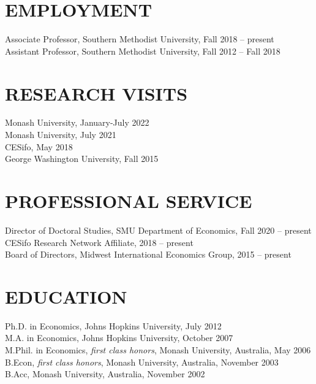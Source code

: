 \documentclass[11pt]{res}
\begin{document}
\begin{resume}
\hspace{-0.5in}\makebox[6.1in]{\hrulefill}

\section{EMPLOYMENT} \vspace{1.5mm}
Associate Professor, Southern Methodist University, Fall 2018 -- present\\
Assistant Professor, Southern Methodist University, Fall 2012 -- Fall 2018

\section{RESEARCH VISITS} \vspace{1.5mm}
Monash University, January-July 2022\vspace{1.5mm}\\
Monash University, July 2021\vspace{1.5mm}\\
CESifo, May 2018\vspace{1.5mm}\\
George Washington University, Fall 2015

\section{PROFESSIONAL SERVICE} \vspace{1.5mm}
Director of Doctoral Studies, SMU Department of Economics, Fall 2020 -- present\\
CESifo Research Network Affiliate, 2018 --  present\\
Board of Directors, Midwest International Economics Group, 2015 -- present

\section{EDUCATION} \vspace{1.5mm}
Ph.D. in Economics, Johns Hopkins University, July 2012 \vspace{1.5mm}\\
M.A. in Economics, Johns Hopkins University, October 2007\vspace{1.5mm}\\
M.Phil. in Economics, \emph{first class honors}, Monash University, Australia, May 2006\vspace{1.5mm}\\
B.Econ, \emph{first class honors}, Monash University, Australia, November 2003\vspace{1.5mm}\\
B.Acc, Monash University, Australia, November 2002


\end{resume}
\end{document}
